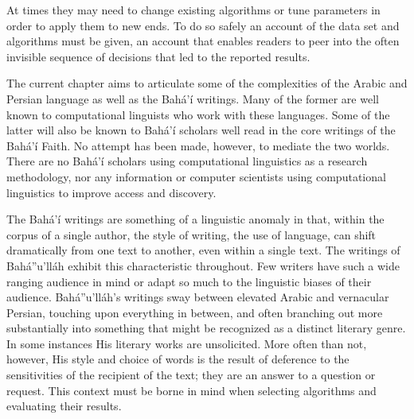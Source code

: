 \documentclass[12pt, oneside]{report}
\begin{document}
At times they may need to change existing algorithms or tune parameters in order to apply them to new ends.
To do so safely an account of the data set and algorithms must be given, an account that enables readers to peer into the often invisible sequence of decisions that led to the reported results.
\par
The current chapter aims to articulate some of the complexities of the Arabic and Persian language as well as the Bah\'{a}'\'{i} writings.
Many of the former are well known to computational linguists who work with these languages.
Some of the latter will also be known to Bah\'{a}'\'{i} scholars well read in the core writings of the Bah\'{a}'\'{i} Faith.
No attempt has been made, however, to mediate the two worlds.
There are no Bah\'{a}'\'{i} scholars using computational linguistics as a research methodology, nor any information or computer scientists using computational linguistics to improve access and discovery.
\par
The Bah\'{a}'\'{i} writings are something of a linguistic anomaly in that, within the corpus of a single author, the style of writing, the use of language, can shift dramatically from one text to another, even within a single text.
The writings of Bah\'{a}''u'll\'{a}h exhibit this characteristic throughout.
Few writers have such a wide ranging audience in mind or adapt so much to the linguistic biases of their audience.
Bah\'{a}''u'll\'{a}h's writings sway between elevated Arabic and vernacular Persian, touching upon everything in between, and often branching out more substantially into something that might be recognized as a distinct literary genre.
In some instances His literary works are unsolicited.
More often than not, however, His style and choice of words is the result of deference to the sensitivities of the recipient of the text; they are an answer to a question or request.
This context must be borne in mind when selecting algorithms and evaluating their results.
\end{document}
